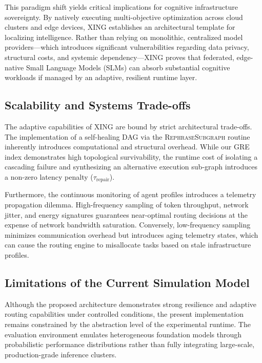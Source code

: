 \documentclass[conference]{IEEEtran}
\begin{document}
This paradigm shift yields critical implications for cognitive infrastructure sovereignty. By natively executing multi-objective optimization across cloud clusters and edge devices, XING establishes an architectural template for localizing intelligence. Rather than relying on monolithic, centralized model providers---which introduces significant vulnerabilities regarding data privacy, structural costs, and systemic dependency---XING proves that federated, edge-native Small Language Models (SLMs) can absorb substantial cognitive workloads if managed by an adaptive, resilient runtime layer.

\subsection{Scalability and Systems Trade-offs}

The adaptive capabilities of XING are bound by strict architectural trade-offs. The implementation of a self-healing DAG via the \textsc{RephraseSubgraph} routine inherently introduces computational and structural overhead. While our GRE index demonstrates high topological survivability, the runtime cost of isolating a cascading failure and synthesizing an alternative execution sub-graph introduces a non-zero latency penalty ($\tau_{\mathrm{repair}}$).

Furthermore, the continuous monitoring of agent profiles introduces a telemetry propagation dilemma. High-frequency sampling of token throughput, network jitter, and energy signatures guarantees near-optimal routing decisions at the expense of network bandwidth saturation. Conversely, low-frequency sampling minimizes communication overhead but introduces aging telemetry states, which can cause the routing engine to misallocate tasks based on stale infrastructure profiles.

\subsection{Limitations of the Current Simulation Model}

Although the proposed architecture demonstrates strong resilience and adaptive routing capabilities under controlled conditions, the present implementation remains constrained by the abstraction level of the experimental runtime. The evaluation environment emulates heterogeneous foundation models through probabilistic performance distributions rather than fully integrating large-scale, production-grade inference clusters.
\end{document}
